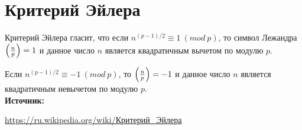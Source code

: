 \documentclass[12pt,a4paper]{scrartcl}
\begin{document}
	
\section{Критерий Эйлера}

Критерий Эйлера гласит, что если $n^{(p-1)/2} \equiv 1\ (mod\ p)$, то символ Лежандра $\left({n \over p}\right)=1$ и данное число $n$ является квадратичным вычетом по модулю $p$.

Если $n^{(p-1)/2} \equiv -1\ (mod\ p)$, то $\left({n \over p}\right)=-1$ и данное число $n$ является квадратичным невычетом по модулю $p$.\\

\textbf{Источник:}

\href{https://ru.wikipedia.org/wiki/%D0%9A%D1%80%D0%B8%D1%82%D0%B5%D1%80%D0%B8%D0%B9_%D0%AD%D0%B9%D0%BB%D0%B5%D1%80%D0%B0}{https://ru.wikipedia.org/wiki/Критерий\_Эйлера}
	
\end{document}
